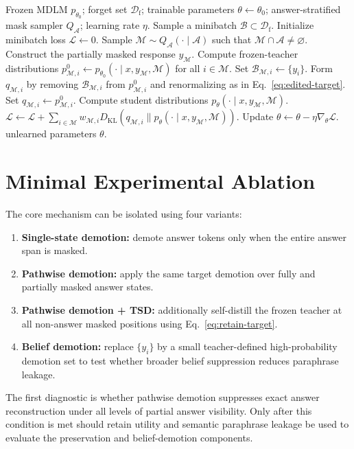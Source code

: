\documentclass{article}
\newcommand{\Df}{\mathcal{D}_{\mathrm f}}
\newcommand{\Mset}{\mathcal{M}}
\newcommand{\Aset}{\mathcal{A}}
\newcommand{\KL}{D_{\mathrm{KL}}}
\newcommand{\Qans}{Q_{\Aset}}
\begin{document}
\begin{algorithm}[t]
\caption{Trajectory-Selective Distillation (TSD)}
\label{alg:tsd}
\begin{algorithmic}[1]
\Require Frozen MDLM $p_{\theta_0}$; forget set $\Df$; trainable parameters
$\theta\leftarrow\theta_0$; answer-stratified mask sampler $\Qans$; learning
rate $\eta$.
    \State Sample a minibatch $\mathcal{B}\subset\Df$.
    \State Initialize minibatch loss $\mathcal{L}\leftarrow 0$.
    \ForAll{$(x,y,\Aset)\in\mathcal{B}$}
        \State Sample $\Mset\sim\Qans(\cdot\mid\Aset)$ such that
        $\Mset\cap\Aset\neq\varnothing$.
        \State Construct the partially masked response $y_{\Mset}$.
        \State Compute frozen-teacher distributions
        $p^0_{\Mset,i}\leftarrow
        p_{\theta_0}(\cdot\mid x,y_{\Mset},\Mset)$ for all $i\in\Mset$.
        \ForAll{$i\in\Mset$}
            \If{$i\in\Aset$}
                \State Set $\mathcal{B}_{\Mset,i}\leftarrow\{y_i\}$.
                \State Form $q_{\Mset,i}$ by removing
                $\mathcal{B}_{\Mset,i}$ from $p^0_{\Mset,i}$ and
                renormalizing as in Eq.~\eqref{eq:edited-target}.
            \Else
                \State Set $q_{\Mset,i}\leftarrow p^0_{\Mset,i}$.
            \EndIf
        \EndFor
        \State Compute student distributions
        $p_{\theta}(\cdot\mid x,y_{\Mset},\Mset)$.
        \State $\mathcal{L}\leftarrow\mathcal{L}
        +\sum_{i\in\Mset}w_{\Mset,i}
        \KL(q_{\Mset,i}\|p_{\theta}(\cdot\mid x,y_{\Mset},\Mset))$.
    \EndFor
    \State Update $\theta\leftarrow\theta-\eta\nabla_{\theta}\mathcal{L}$.
\EndFor
\State \Return unlearned parameters $\theta$.
\end{algorithmic}
\end{algorithm}

\section{Minimal Experimental Ablation}
The core mechanism can be isolated using four variants:
\begin{enumerate}[leftmargin=*]
    \item \textbf{Single-state demotion:} demote answer tokens only when the
    entire answer span is masked.
    \item \textbf{Pathwise demotion:} apply the same target demotion over fully
    and partially masked answer states.
    \item \textbf{Pathwise demotion + TSD:} additionally self-distill the
    frozen teacher at all non-answer masked positions using
    Eq.~\eqref{eq:retain-target}.
    \item \textbf{Belief demotion:} replace $\{y_i\}$ by a small
    teacher-defined high-probability demotion set to test whether broader
    belief suppression reduces paraphrase leakage.
\end{enumerate}
The first diagnostic is whether pathwise demotion suppresses exact answer
reconstruction under all levels of partial answer visibility. Only after this
condition is met should retain utility and semantic paraphrase leakage be used
to evaluate the preservation and belief-demotion components.
\end{document}
